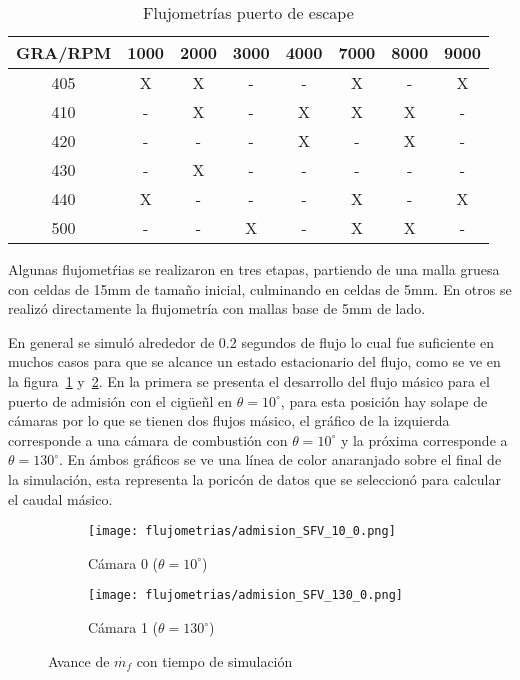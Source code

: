 \begin{table}[ht]
  \centering
  \begin{tabular}{cccccccc}\toprule
    GRA/RPM & 1000 & 2000 & 3000 & 4000 & 7000 & 8000 & 9000 \\ \midrule
    405     & X    & X    & -    & -    & X    & -    & X \\
    410     & -    & X    & -    & X    & X    & X    & - \\
    420     & -    & -    & -    & X    & -    & X    & - \\
    430     & -    & X    & -    & -    & -    & -    & - \\
    440     & X    & -    & -    & -    & X    & -    & X \\
    500     & -    & -    & X    & -    & X    & X    & - \\ \bottomrule
  \end{tabular}
  \caption{Flujometrías puerto de escape}\label{tab:flujometrias_escape}
\end{table}

Algunas flujometŕias se realizaron en tres etapas, partiendo de una malla gruesa
con celdas de 15mm de tamaño inicial, culminando en celdas de 5mm.
%
En otros se realizó directamente la flujometría con mallas base de 5mm de lado.

En general se simuló alrededor de 0.2 segundos de flujo lo cual fue suficiente
en muchos casos para que se alcance un estado estacionario del flujo, como se ve
en la figura~\ref{fig:flujoemtrias_1_a} y~\ref{fig:flujoemtrias_1_b}.
%
En la primera se presenta el desarrollo del flujo másico para el puerto de
admisión con el cigüeñl en $\theta=10^{\circ}$, para esta posición hay solape de
cámaras por lo que se tienen dos flujos másico, el gráfico de la izquierda
corresponde a una cámara de combustión con $\theta=10^{\circ}$ y la próxima
corresponde a $\theta=130^{\circ}$.
%
En ámbos gráficos se ve una línea de color anaranjado sobre el final de la
simulación, esta representa la poricón de datos que se seleccionó para calcular
el caudal másico.

\begin{figure}[ht]
  \centering
  \begin{subfigure}{\textwidth}
    \centering
    \texttt{[image: flujometrias/admision\_SFV\_10\_0.png]}
    \caption{Cámara 0 ($\theta=10^{\circ}$)}\label{fig:flujoemtrias_1_a}
  \end{subfigure}
  \hfill
  \begin{subfigure}{\textwidth}
    \centering
    \texttt{[image: flujometrias/admision\_SFV\_130\_0.png]}
    \caption{Cámara 1 ($\theta=130^{\circ}$)}\label{fig:flujoemtrias_1_b}
  \end{subfigure}
  \caption{Avance de $\dot{m_{f}}$ con tiempo de simulación}\label{fig:flujometrias_1}
\end{figure}



